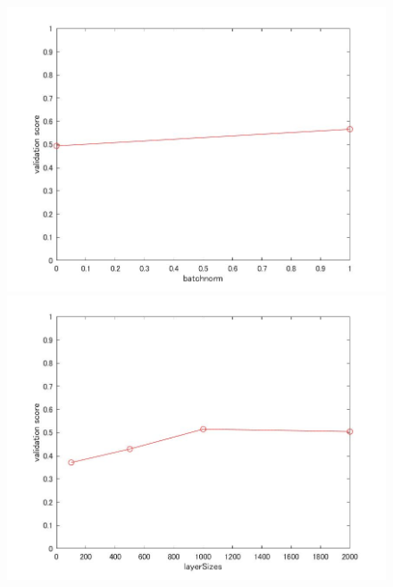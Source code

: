 \documentclass[a4j,11pt]{jarticle}
\begin{document}
\begin{figure}
	\begin{minipage}{0.50\hsize}
		\begin{center}
			\includegraphics[width=12cm, bb=0 0 875 656]{../matlab/fig/batchnorm.jpg}
		\end{center}
	\end{minipage}
	\begin{minipage}{0.50\hsize}
		\begin{center}
			\includegraphics[width=12cm, bb=0 0 875 656]{../matlab/fig/layerSizes.jpg}
		\end{center}
	\end{minipage}
	\\
	\begin{minipage}{0.50\hsize}
		\begin{center}

\end{center}
\end{minipage}
\end{figure}
\end{document}
